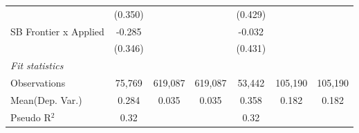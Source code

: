 \begin{tabular}{lcccccc}
                         & (0.350)       &         &         & (0.429)       &         &   \\   
   SB Frontier x Applied & -0.285        &         &         & -0.032        &         &   \\   
                         & (0.346)       &         &         & (0.431)       &         &   \\   
   \midrule
   \emph{Fit statistics}\\
   Observations          & 75,769        & 619,087 & 619,087 & 53,442        & 105,190 & 105,190\\  
Mean(Dep. Var.) & 0.284 & 0.035 & 0.035 & 0.358 & 0.182 & 0.182 \\
   Pseudo R$^2$          & 0.32          &         &         & 0.32          &         & \\  
   

\end{tabular}
